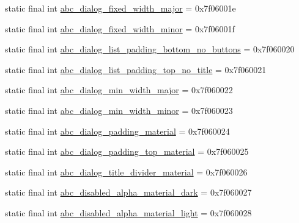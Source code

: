 \begin{DoxyCompactItemize}
static final int \mbox{\hyperlink{classcom_1_1synnapps_1_1carouselview_1_1_r_1_1dimen_a552bb48c988c0530f57b43eae8fcdc8f}{abc\+\_\+dialog\+\_\+fixed\+\_\+width\+\_\+major}} = 0x7f06001e
\item 
static final int \mbox{\hyperlink{classcom_1_1synnapps_1_1carouselview_1_1_r_1_1dimen_aa72316367c6cbb5321c582aaaebe9fba}{abc\+\_\+dialog\+\_\+fixed\+\_\+width\+\_\+minor}} = 0x7f06001f
\item 
static final int \mbox{\hyperlink{classcom_1_1synnapps_1_1carouselview_1_1_r_1_1dimen_a5c960e3047db8cb4f2d09bd123a8a12d}{abc\+\_\+dialog\+\_\+list\+\_\+padding\+\_\+bottom\+\_\+no\+\_\+buttons}} = 0x7f060020
\item 
static final int \mbox{\hyperlink{classcom_1_1synnapps_1_1carouselview_1_1_r_1_1dimen_a36d376a19a13331322515e0b6fd7e397}{abc\+\_\+dialog\+\_\+list\+\_\+padding\+\_\+top\+\_\+no\+\_\+title}} = 0x7f060021
\item 
static final int \mbox{\hyperlink{classcom_1_1synnapps_1_1carouselview_1_1_r_1_1dimen_a46a3ea07d82190401f36c646b75930d4}{abc\+\_\+dialog\+\_\+min\+\_\+width\+\_\+major}} = 0x7f060022
\item 
static final int \mbox{\hyperlink{classcom_1_1synnapps_1_1carouselview_1_1_r_1_1dimen_ae5ea1330e42f8e4cea7cbcfb1a6ec3bd}{abc\+\_\+dialog\+\_\+min\+\_\+width\+\_\+minor}} = 0x7f060023
\item 
static final int \mbox{\hyperlink{classcom_1_1synnapps_1_1carouselview_1_1_r_1_1dimen_a9116cdc69a1990a6880cd7dfdb1883fb}{abc\+\_\+dialog\+\_\+padding\+\_\+material}} = 0x7f060024
\item 
static final int \mbox{\hyperlink{classcom_1_1synnapps_1_1carouselview_1_1_r_1_1dimen_a1d7d7d2332520094d65d14941249e778}{abc\+\_\+dialog\+\_\+padding\+\_\+top\+\_\+material}} = 0x7f060025
\item 
static final int \mbox{\hyperlink{classcom_1_1synnapps_1_1carouselview_1_1_r_1_1dimen_a7ff3ea5eef082b083a2de63d9de3c955}{abc\+\_\+dialog\+\_\+title\+\_\+divider\+\_\+material}} = 0x7f060026
\item 
static final int \mbox{\hyperlink{classcom_1_1synnapps_1_1carouselview_1_1_r_1_1dimen_a907c3510ed43c7627103b04af8beb869}{abc\+\_\+disabled\+\_\+alpha\+\_\+material\+\_\+dark}} = 0x7f060027
\item 
static final int \mbox{\hyperlink{classcom_1_1synnapps_1_1carouselview_1_1_r_1_1dimen_ab35a86d5db6669dac4e43395ac7e6302}{abc\+\_\+disabled\+\_\+alpha\+\_\+material\+\_\+light}} = 0x7f060028
\item 

\end{DoxyCompactItemize}
